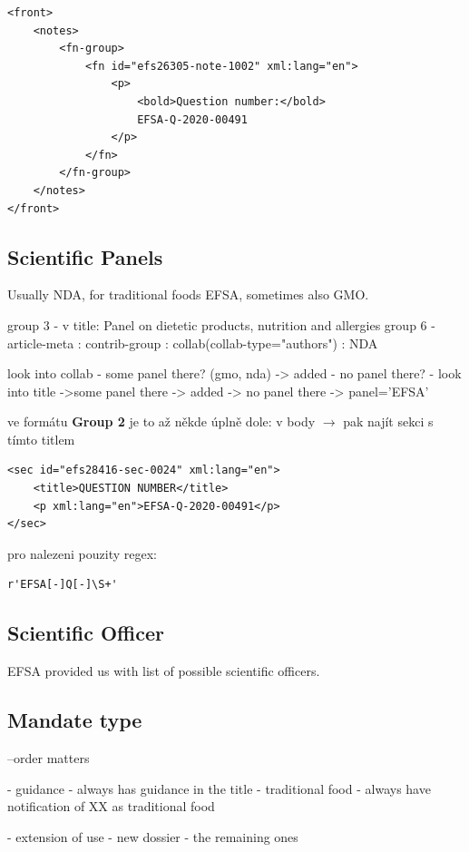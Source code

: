 \documentclass[12pt]{article}
\begin{document}
\lstset{language=XML}
\begin{lstlisting}
<front>
    <notes>
        <fn-group>
            <fn id="efs26305-note-1002" xml:lang="en">
                <p>
                    <bold>Question number:</bold>
                    EFSA-Q-2020-00491
                </p>
            </fn>
        </fn-group>
    </notes>
</front>
\end{lstlisting}

\subsection{Scientific Panels}
Usually NDA, for traditional foods EFSA, sometimes also GMO.


group 3 - v title: Panel on dietetic products, nutrition and allergies
group 6 - article-meta : contrib-group : collab(collab-type="authors") : NDA

look into collab - some panel there? (gmo, nda) -> added
                - no panel there?
                    - look into title ->some panel there -> added
                                        -> no panel there -> panel='EFSA'

ve formátu \textbf{Group 2} je to až někde úplně dole:
v body $\rightarrow$ pak najít sekci s tímto titlem

\lstset{language=XML}
\begin{lstlisting}
<sec id="efs28416-sec-0024" xml:lang="en">
    <title>QUESTION NUMBER</title>
    <p xml:lang="en">EFSA-Q-2020-00491</p>
</sec>
\end{lstlisting}

pro nalezeni pouzity regex: 
\lstset{language=Python}
\begin{lstlisting}
r'EFSA[-]Q[-]\S+'
\end{lstlisting}

\subsection{Scientific Officer}
EFSA provided us with list of possible scientific officers.


\subsection{Mandate type}
--order matters

- guidance - always has guidance in the title
- traditional food - always have notification of XX as traditional food

- extension of use
- new dossier - the remaining ones
\end{document}

